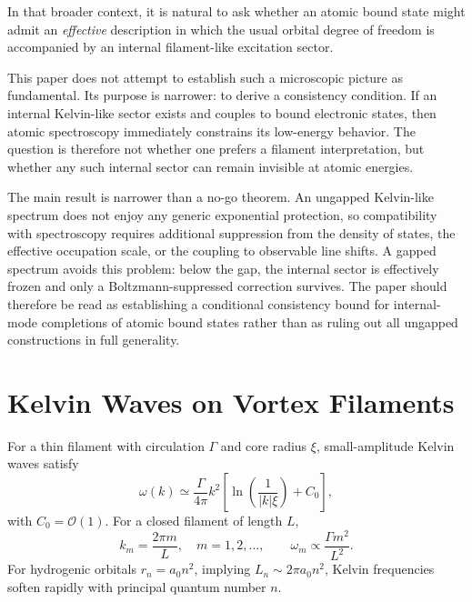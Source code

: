 \documentclass[pdflatex,sn-mathphys-num]{sn-jnl}
\begin{document}
        In that broader context, it is natural to ask whether an atomic bound state might admit an \emph{effective} description in which the usual orbital degree of freedom is accompanied by an internal filament-like excitation sector.

        This paper does not attempt to establish such a microscopic picture as fundamental. Its purpose is narrower: to derive a consistency condition. If an internal Kelvin-like sector exists and couples to bound electronic states, then atomic spectroscopy immediately constrains its low-energy behavior. The question is therefore not whether one prefers a filament interpretation, but whether any such internal sector can remain invisible at atomic energies.

        The main result is narrower than a no-go theorem. An ungapped Kelvin-like spectrum does not enjoy any generic exponential protection, so compatibility with spectroscopy requires additional suppression from the density of states, the effective occupation scale, or the coupling to observable line shifts. A gapped spectrum avoids this problem: below the gap, the internal sector is effectively frozen and only a Boltzmann-suppressed correction survives. The paper should therefore be read as establishing a conditional consistency bound for internal-mode completions of atomic bound states rather than as ruling out all ungapped constructions in full generality.

    \section{Kelvin Waves on Vortex Filaments}\label{sec:kelvin}
        For a thin filament with circulation $\Gamma$ and core radius $\xi$, small-amplitude Kelvin waves satisfy \cite{LordKelvin1880,Barenghi2014}
        \begin{equation}
            \omega(k) \simeq \frac{\Gamma}{4\pi} k^2
            \left[
                \ln\!\left(\frac{1}{|k|\xi}\right) + C_0
            \right],
            \label{eq:kelvin_dispersion}
        \end{equation}
        with $C_0=\mathcal{O}(1)$. For a closed filament of length $L$,
        \begin{equation}
            k_m = \frac{2\pi m}{L}, \quad m=1,2,\dots,\qquad
            \omega_m \propto \frac{\Gamma m^2}{L^2}.
        \end{equation}
        For hydrogenic orbitals $r_n=a_0 n^2$, implying $L_n\sim 2\pi a_0 n^2$, Kelvin frequencies soften rapidly with principal quantum number $n$.
\end{document}
